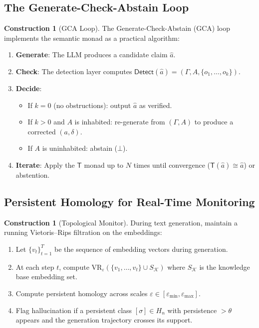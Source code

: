 \documentclass[11pt,a4paper]{article}
\theoremstyle{plain}
\theoremstyle{definition}
\newtheorem{construction}[theorem]{Construction}
\theoremstyle{remark}
\newcommand{\VR}{\mathrm{VR}}
\newcommand{\Detect}{\mathsf{Detect}}
\newcommand{\SemanticT}{\mathsf{T}}
\begin{document}
\subsection{The Generate-Check-Abstain Loop}

\begin{construction}[GCA Loop]\label{con:gca}
The Generate-Check-Abstain (GCA) loop implements the semantic monad as a practical algorithm:
\begin{enumerate}[nosep]
  \item \textbf{Generate}: The LLM produces a candidate claim $\hat{a}$.
  \item \textbf{Check}: The detection layer computes $\Detect(\hat{a}) = (\Gamma, A, \{o_1, \ldots, o_k\})$.
  \item \textbf{Decide}:
    \begin{itemize}[nosep]
      \item If $k = 0$ (no obstructions): output $\hat{a}$ as verified.
      \item If $k > 0$ and $A$ is inhabited: re-generate from $(\Gamma, A)$ to produce a corrected $(a, \delta)$.
      \item If $A$ is uninhabited: abstain ($\bot$).
    \end{itemize}
  \item \textbf{Iterate}: Apply the $\SemanticT$ monad up to $N$ times until convergence ($\SemanticT(\hat{a}) \cong \hat{a}$) or abstention.
\end{enumerate}
\end{construction}

\subsection{Persistent Homology for Real-Time Monitoring}

\begin{construction}[Topological Monitor]\label{con:topo-monitor}
During text generation, maintain a running Vietoris--Rips filtration on the embeddings:
\begin{enumerate}[nosep]
  \item Let $\{v_t\}_{t=1}^T$ be the sequence of embedding vectors during generation.
  \item At each step $t$, compute $\VR_\varepsilon(\{v_1, \ldots, v_t\} \cup S_{\mathcal{K}})$ where $S_{\mathcal{K}}$ is the knowledge base embedding set.
  \item Compute persistent homology across scales $\varepsilon \in [\varepsilon_{\min}, \varepsilon_{\max}]$.
  \item Flag hallucination if a persistent class $[\sigma] \in H_n$ with persistence $> \theta$ appears and the generation trajectory crosses its support.
\end{enumerate}
\end{construction}
\end{document}

